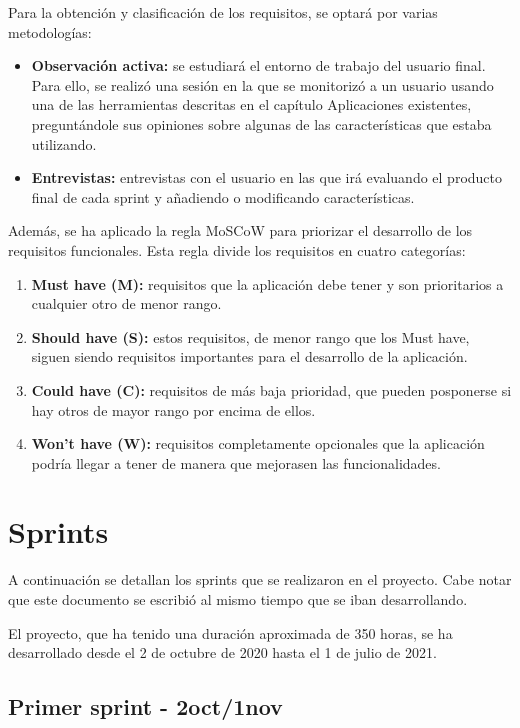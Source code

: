 Para la obtención y clasificación de los requisitos, se optará por varias metodologías:
\begin{itemize}
	\item \textbf{Observación activa:} se estudiará el entorno de trabajo del usuario final. Para ello, se realizó una sesión en la que se monitorizó a un usuario usando una de las herramientas descritas en el capítulo Aplicaciones existentes, preguntándole sus opiniones sobre algunas de las características que estaba utilizando.
	\item \textbf{Entrevistas:} entrevistas con el usuario en las que irá evaluando el producto final de cada sprint y añadiendo o modificando características.
\end{itemize}

Además, se ha aplicado la regla MoSCoW para priorizar el desarrollo de los requisitos funcionales. Esta regla divide los requisitos en cuatro categorías:
\begin{enumerate}
	\item \textbf{Must have (M):} requisitos que la aplicación debe tener y son prioritarios a cualquier otro de menor rango.	
	\item \textbf{Should have (S):} estos requisitos, de menor rango que los Must have, siguen siendo requisitos importantes para el desarrollo de la aplicación.	
	\item \textbf{Could have (C):} requisitos de más baja prioridad, que pueden posponerse si hay otros de mayor rango por encima de ellos.	
	\item \textbf{Won't have (W):} requisitos completamente opcionales que la aplicación podría llegar a tener de manera que mejorasen las funcionalidades.
	
\end{enumerate}

\section{Sprints}

A continuación se detallan los sprints que se realizaron en el proyecto. Cabe notar que este documento se escribió al mismo tiempo que se iban desarrollando.

El proyecto, que ha tenido una duración aproximada de 350 horas, se ha desarrollado desde el 2 de octubre de 2020 hasta el 1 de julio de 2021.

\subsection{Primer sprint - 2oct/1nov}

